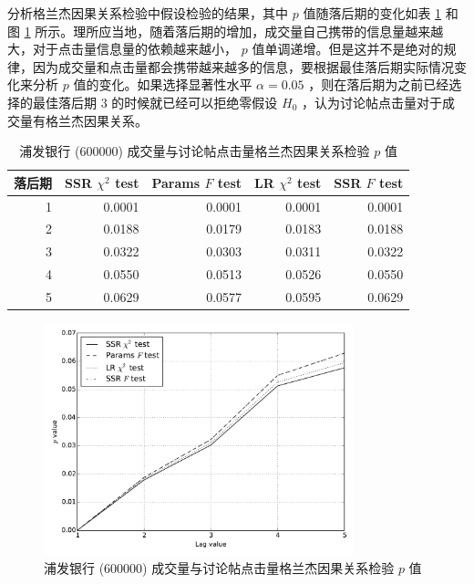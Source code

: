 分析格兰杰因果关系检验中假设检验的结果，其中 $p$ 值随落后期的变化如表 \ref{f_test:10} 和图 \ref{f_test:11} 所示。理所应当地，随着落后期的增加，成交量自己携带的信息量越来越大，对于点击量信息量的依赖越来越小， $p$ 值单调递增。但是这并不是绝对的规律，因为成交量和点击量都会携带越来越多的信息，要根据最佳落后期实际情况变化来分析 $p$ 值的变化。如果选择显著性水平 $\alpha=0.05$ ，则在落后期为之前已经选择的最佳落后期 $3$ 的时候就已经可以拒绝零假设 $H_{0}$ ，认为讨论帖点击量对于成交量有格兰杰因果关系。

\begin{table}
  \centering
  \caption{浦发银行 (600000) 成交量与讨论帖点击量格兰杰因果关系检验 $p$ 值}
  \label{f_test:10}
  \begin{tabular}{rrrrr}
    \toprule
    落后期 & SSR $\chi^{2}$ test & Params $F$ test & LR $\chi^{2}$ test & SSR $F$ test \\
    \midrule
    1 & 0.0001 & 0.0001 & 0.0001 & 0.0001 \\
    2 & 0.0188 & 0.0179 & 0.0183 & 0.0188 \\
    3 & 0.0322 & 0.0303 & 0.0311 & 0.0322 \\
    4 & 0.0550 & 0.0513 & 0.0526 & 0.0550 \\
    5 & 0.0629 & 0.0577 & 0.0595 & 0.0629 \\
    \bottomrule
  \end{tabular}
\end{table}

\begin{figure}
  \centering
  \includegraphics[width=0.8\textwidth]{plots/click_count_volume_granger_causality_test.pdf}
  \caption{浦发银行 (600000) 成交量与讨论帖点击量格兰杰因果关系检验 $p$ 值}
  \label{f_test:11}
\end{figure}

